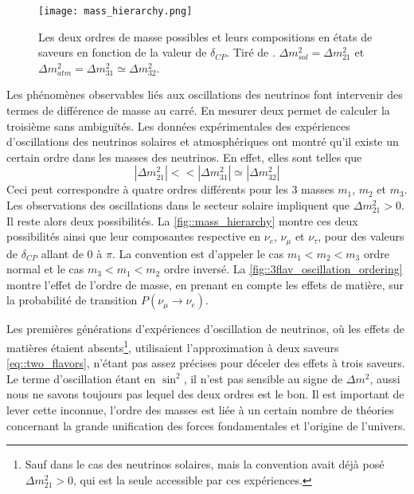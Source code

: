         \begin{figure}[!htb]
          \centering
          \texttt{[image: mass\_hierarchy.png]}
          \caption[Les deux ordres de masse possibles]{\label{fig::mass_hierarchy}Les deux ordres de masse possibles et leurs compositions en états de saveurs en fonction de la valeur de $\delta_{CP}$. Tiré de \cite{Qian2015}. $\Delta m^2_{sol}=\Delta m^2_{21}$ et $\Delta m^2_{atm}=\Delta m^2_{31}\simeq\Delta m^2_{32}$.}
        \end{figure}
        Les phénomènes observables liés aux oscillations des neutrinos font intervenir des termes de différence de masse au carré. En mesurer deux permet de calculer la troisième sans ambiguïtés. Les données expérimentales des expériences d'oscillations des neutrinos solaires et atmosphériques ont montré qu'il existe un certain ordre dans les masses des neutrinos. En effet, elles sont telles que
        \begin{equation}\label{eq::mass_hierarchy}
          |\Delta m^2_{21}| <<|\Delta m^2_{31}| \simeq |\Delta m^2_{32}| 
        \end{equation}
        Ceci peut correspondre à quatre ordres différents pour les 3 masses $m_1$, $m_2$ et $m_3$. Les observations des oscillations dans le secteur solaire impliquent que $\Delta m^2_{21} > 0$\cite{pdg2018}. Il reste alors deux possibilités. La \autoref{fig::mass_hierarchy} montre ces deux possibilités ainsi que leur composantes respective en $\nu_e$, $\nu_{\mu}$ et $\nu_{\tau}$, pour des valeurs de $\delta_{CP}$ allant de 0 à $\pi$\cite{Qian2015}. La convention est d'appeler le cas $m_1 < m_2 < m_3$ ordre normal et le cas $m_3 < m_1 < m_2$ ordre inversé. La \autoref{fig::3flav_oscillation_ordering} montre l'effet de l'ordre de masse, en prenant en compte les effets de matière, sur la probabilité de transition $P(\nu_{\mu}\to\nu_e)$.
        
        Les premières générations d'expériences d'oscillation de neutrinos, où les effets de matières étaient absents\footnote{Sauf dans le cas des neutrinos solaires, mais la convention avait déjà posé $\Delta m^2_{21} > 0$, qui est la seule accessible par ces expériences.}, utilisaient l'approximation à deux saveurs \eqref{eq::two_flavors}, n'étant pas assez précises pour déceler des effets à trois saveurs. Le terme d'oscillation étant en $\sin^2$, il n'est pas sensible au signe de $\Delta m^2$, aussi nous ne savons toujours pas lequel des deux ordres est le bon. Il est important de lever cette inconnue, l'ordre des masses est liée à un certain nombre de théories concernant la grande unification des forces fondamentales et l'origine de l'univers\cite{KH-website}.
        
